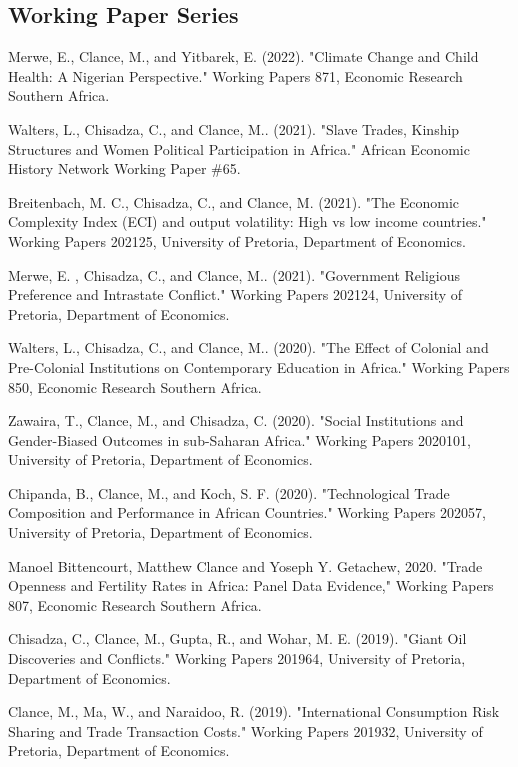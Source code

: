 \documentclass[margin,line]{res}                          %
\newenvironment{list1}{
  \begin{list}{\ding{113}}{%
      \setlength{\itemsep}{0.4em}
      \setlength{\parsep}{0in} \setlength{\parskip}{0in}
      \setlength{\topsep}{0in} \setlength{\partopsep}{0in} 
      \setlength{\leftmargin}{0.17in}}}{\end{list}}
\begin{document}
\begin{resume}
\section{\sc Working Paper Series}
\begin{list1}
\item[] Merwe, E., Clance, M., and Yitbarek, E. (2022). "Climate Change and Child Health: A Nigerian Perspective." Working Papers 871, Economic Research Southern Africa. 
\item[] Walters, L., Chisadza, C., and Clance, M.. (2021). "Slave Trades, Kinship Structures and Women Political Participation in Africa." African Economic History Network Working Paper \#65.
\item[] Breitenbach, M. C., Chisadza, C., and Clance, M. (2021). "The Economic Complexity Index (ECI) and output volatility: High vs low income countries." Working Papers 202125, University of Pretoria, Department of Economics.
\item[] Merwe, E. , Chisadza, C., and Clance, M.. (2021). "Government Religious Preference and Intrastate Conflict." Working Papers 202124, University of Pretoria, Department of Economics.
\item[] Walters, L., Chisadza, C., and Clance, M.. (2020). "The Effect of Colonial and Pre-Colonial Institutions on Contemporary Education in Africa." Working Papers 850, Economic Research Southern Africa.
\item[] Zawaira, T., Clance, M., and Chisadza, C. (2020). "Social Institutions and Gender-Biased Outcomes in sub-Saharan Africa." Working Papers 2020101, University of Pretoria, Department of Economics.
\item[] Chipanda, B., Clance, M., and Koch, S. F. (2020). "Technological Trade Composition and Performance in African Countries." Working Papers 202057, University of Pretoria, Department of Economics.
\item[] Manoel Bittencourt, Matthew Clance and Yoseph Y. Getachew, 2020. "Trade Openness and Fertility Rates in Africa: Panel Data Evidence," Working Papers 807, Economic Research Southern Africa.
\item[] Chisadza, C., Clance, M., Gupta, R., and Wohar, M. E. (2019). "Giant Oil Discoveries and Conflicts." Working Papers 201964, University of Pretoria, Department of Economics.
\item[] Clance, M., Ma, W., and Naraidoo, R. (2019). "International Consumption Risk Sharing and Trade Transaction Costs." Working Papers 201932, University of Pretoria, Department of Economics.

\end{list1}
\end{resume}
\end{document}
